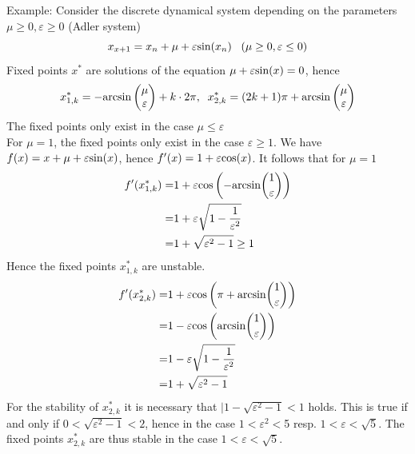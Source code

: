 Example: Consider the discrete dynamical system depending on the parameters $\mu \geq 0, \varepsilon \geq 0$ (Adler system)
\begin{equation}
  x_{x+1} = x_n + \mu + \varepsilon \textup{sin}(x_n) \;\;\; (\mu \geq 0, \varepsilon \leq 0)
\end{equation}
Fixed points $x^*$ are solutions of the equation $\mu + \varepsilon \textup{sin}(x) = 0$, hence
\begin{equation}
  x^*_{1, k} = -\textup{arcsin}\begin{pmatrix} \mu \\ \varepsilon \end{pmatrix} + k \cdot 2\pi, \;\;
  x^*_{2, k} = (2k + 1)\pi + \textup{arcsin}\begin{pmatrix} \mu \\ \varepsilon \end{pmatrix}
\end{equation}
The fixed points only exist in the case $\mu \leq \varepsilon$\\
For $\mu = 1$, the fixed points only exist in the case $\varepsilon \geq 1$. We have $f(x) = x + \mu + \varepsilon \textup{sin}(x)$, hence $f'(x) = 1 + \varepsilon \textup{cos}(x)$. It follows that for $\mu = 1$
\begin{equation}
  \begin{split}
    f'(x^*_{1, k}) =& 1 + \varepsilon \textup{cos}\left(-\textup{arcsin}\binom{1}{\varepsilon}\right)\\
    =& 1 + \varepsilon \sqrt{1 - \frac{1}{\varepsilon^2}}\\
    =& 1 + \sqrt{\varepsilon^2 - 1} \geq 1
  \end{split}
\end{equation}
Hence the fixed points $x^*_{1, k}$ are unstable.
\begin{equation}
  \begin{split}
    f'(x^*_{2, k}) =& 1 + \varepsilon \textup{cos}\left(\pi + \textup{arcsin}\binom{1}{\varepsilon}\right)\\
    =& 1 - \varepsilon \textup{cos}\left(\textup{arcsin}\binom{1}{\varepsilon}\right)\\
    =& 1 - \varepsilon \sqrt{1 - \frac{1}{\varepsilon^2}}\\
    =& 1 + \sqrt{\varepsilon^2 - 1}
  \end{split}
\end{equation}
For the stability of $x^*_{2, k}$ it is necessary that $|1 - \sqrt{\varepsilon^2-1} < 1$ holds. This is true if and only if $0 < \sqrt{\varepsilon^2 - 1} < 2$, hence in the case $1 < \varepsilon^2 < $5 resp. $1 < \varepsilon < \sqrt{5}$. The fixed points $x^*_{2, k}$ are thus stable in the case $1<\varepsilon<\sqrt{5}$.
